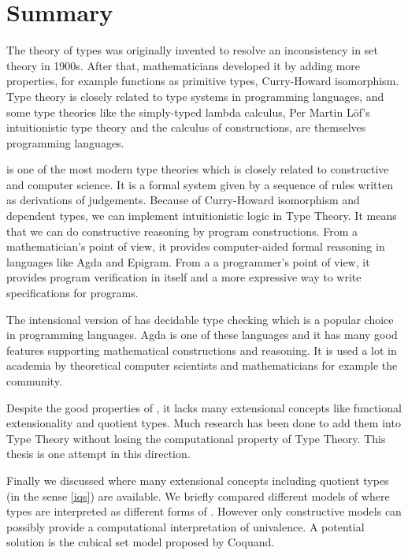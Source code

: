 \section{Summary}


The theory of types was originally invented to resolve an inconsistency in set theory in 1900s. After that, mathematicians developed it by adding more properties, for example functions as primitive types, Curry-Howard isomorphism. Type theory is closely related to type systems in programming languages, and some type theories like the simply-typed lambda calculus, Per Martin L\"{o}f's intuitionistic type theory and the calculus of constructions, are themselves programming languages. 

\mltt is one of the most modern type theories which is closely related to constructive \maths and computer science. It is a formal system given by a sequence of rules written as derivations of judgements. Because of Curry-Howard isomorphism and dependent types, we can implement intuitionistic logic in Type Theory. It means that we can do constructive reasoning by program constructions. From a mathematician's point of view, it provides computer-aided formal reasoning in languages like Agda and Epigram. From a a programmer's point of view, it provides program verification in itself and a more expressive way to write specifications for programs.

The intensional version of \mltt has decidable type checking which is a popular choice in programming languages. Agda is one of these languages and it has many good features supporting mathematical constructions and reasoning. It is used a lot in academia by theoretical computer scientists and mathematicians for example the \hott community. 

Despite the good properties of \itt, it lacks many extensional concepts like functional extensionality and quotient types. Much research has been done to add them into Type Theory without losing the computational property of Type Theory. This thesis is one attempt in this direction.

Finally we discussed \hott where many extensional concepts including quotient types (in the sense \autoref{iqs}) are available. 
We briefly compared different models of \hott where types are interpreted as different forms of \wog. However only constructive models can possibly provide a computational interpretation of univalence.
A potential solution is the cubical set model proposed by Coquand.















